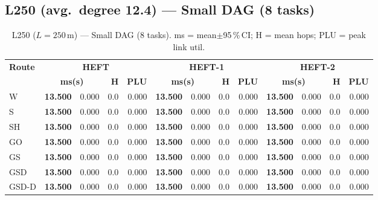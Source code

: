 \documentclass[11pt]{article}
\newcommand{\win}[1]{\textcolor{green!50!black}{\textbf{#1}}}
\begin{document}
\subsection{L250 (avg.\ degree 12.4) --- Small DAG (8 tasks)}
\begin{table}[H]\centering\small
\begin{tabular}{l r@{$\pm$}l r r r@{$\pm$}l r r r@{$\pm$}l r r}
\toprule
\textbf{Route} & \multicolumn{4}{c}{\textbf{HEFT}} & \multicolumn{4}{c}{\textbf{HEFT-1}} & \multicolumn{4}{c}{\textbf{HEFT-2}} \\
\cmidrule(lr){2-5}\cmidrule(lr){6-9}\cmidrule(lr){10-13}
& \multicolumn{2}{c}{\textbf{ms(s)}} & \textbf{H} & \textbf{PLU}& \multicolumn{2}{c}{\textbf{ms(s)}} & \textbf{H} & \textbf{PLU}& \multicolumn{2}{c}{\textbf{ms(s)}} & \textbf{H} & \textbf{PLU} \\
\midrule
  W & \win{13.500} & 0.000 & 0.0 & 0.000 & \win{13.500} & 0.000 & 0.0 & 0.000 & \win{13.500} & 0.000 & 0.0 & 0.000 \\
  S & \win{13.500} & 0.000 & 0.0 & 0.000 & \win{13.500} & 0.000 & 0.0 & 0.000 & \win{13.500} & 0.000 & 0.0 & 0.000 \\
  SH & \win{13.500} & 0.000 & 0.0 & 0.000 & \win{13.500} & 0.000 & 0.0 & 0.000 & \win{13.500} & 0.000 & 0.0 & 0.000 \\
  GO & \win{13.500} & 0.000 & 0.0 & 0.000 & \win{13.500} & 0.000 & 0.0 & 0.000 & \win{13.500} & 0.000 & 0.0 & 0.000 \\
  GS & \win{13.500} & 0.000 & 0.0 & 0.000 & \win{13.500} & 0.000 & 0.0 & 0.000 & \win{13.500} & 0.000 & 0.0 & 0.000 \\
  GSD & \win{13.500} & 0.000 & 0.0 & 0.000 & \win{13.500} & 0.000 & 0.0 & 0.000 & \win{13.500} & 0.000 & 0.0 & 0.000 \\
  GSD-D & \win{13.500} & 0.000 & 0.0 & 0.000 & \win{13.500} & 0.000 & 0.0 & 0.000 & \win{13.500} & 0.000 & 0.0 & 0.000 \\
\bottomrule\end{tabular}
\caption{L250 ($L=250$\,m) --- Small DAG (8 tasks). ms = mean$\pm$95\,\%\,CI; H = mean hops; PLU = peak link util.}
\end{table}
\end{document}
